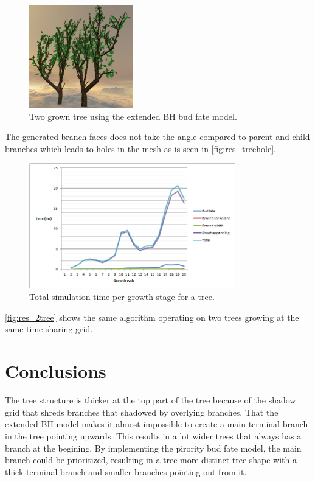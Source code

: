 \documentclass[11pt]{article} %
\begin{document}
\begin{figure}[!htp]
	\centering
	\includegraphics[width=0.4\textwidth]{2tree.png}
	\caption{Two grown tree using the extended BH bud fate model.}
	\label{fig:res_2tree}
\end{figure}

The generated branch faces does not take the angle compared to parent and child branches which leads to holes in the mesh as is seen in \autoref{fig:res_treehole}.

\begin{figure}[htp]
	\centering
	\includegraphics[width=0.8\textwidth]{timingTotal.png}
	\caption{Total simulation time per growth stage for a tree.}
	\label{fig:res_timingTotal}
\end{figure}

\autoref{fig:res_2tree} shows the same algorithm operating on two trees growing at the same time sharing grid.

\section{Conclusions}
The tree structure is thicker at the top part of the tree because of the shadow grid that shreds branches that shadowed by overlying branches.
That the extended BH model makes it almost impossible to create a main terminal branch in the tree pointing upwards.
This results in a lot wider trees that always has a branch at the begining.
By implementing the pirority bud fate model, the main branch could be prioritized, resulting in a tree more distinct tree shape with a thick terminal branch and smaller branches pointing out from it.
\end{document}
